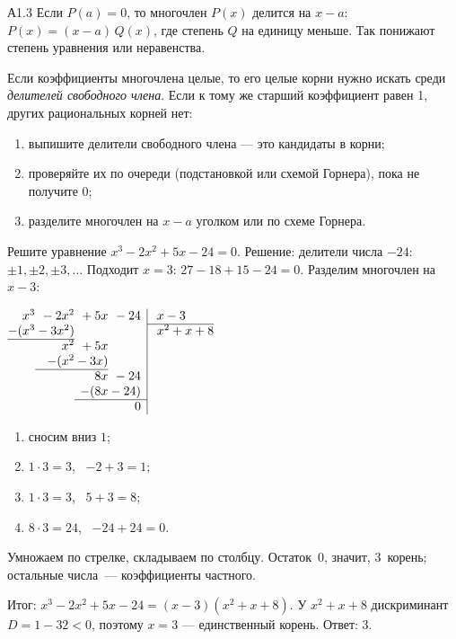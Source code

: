 
\begin{tema}{А1.3}
 Если $P(a)=0$, то многочлен $P(x)$ делится на $x-a$:
$P(x)=(x-a)\,Q(x)$, где степень $Q$ на единицу меньше. Так понижают степень
уравнения или неравенства.

 Если коэффициенты многочлена целые, то его целые корни нужно искать
среди \emph{делителей свободного члена}. Если к тому же старший коэффициент равен 1,
других рациональных корней нет:
\begin{enumerate}
  \item выпишите делители свободного члена — это кандидаты в корни;
  \item проверяйте их по очереди (подстановкой или схемой Горнера), пока не получите 0;
  \item разделите многочлен на $x-a$ уголком или по схеме Горнера.
\end{enumerate}

\begin{primer}
Решите уравнение $x^3-2x^2+5x-24=0$. Решение: делители числа $-24$: $\pm1,\pm2,\pm3,\dots$
Подходит $x=3$: $27-18+15-24=0$. Разделим многочлен на $x-3$:
\end{primer}

\begin{minipage}[t]{0.5\linewidth}
\par\smallskip
\small
$\begin{array}{@{}r@{}r@{}r@{}r|l@{}}
x^3 & {}-2x^2 & {}+5x & {}-24 & \;x-3\\ \cline{5-5}
-(x^3 & {}-3x^2) & & & \;x^2+x+8\\ \cline{1-2}
 & x^2 & {}+5x & & \\
 & -(x^2 & {}-3x) & & \\ \cline{2-3}
 & & 8x & {}-24 & \\
 & & -(8x & {}-24) & \\ \cline{3-4}
 & & & 0 &
\end{array}$
\end{minipage}\hfill
\begin{minipage}[t]{0.46\linewidth}
\par\smallskip
{}\par\smallskip
\footnotesize\raggedright
\begin{enumerate}[leftmargin=4mm, itemsep=0pt, topsep=0pt, label=\arabic*)]
  \item \textcolor{pfBrend}{сносим вниз} $1$;
  \item \textcolor{pfOrange}{$1\cdot3=3$}, \ $-2+3=1$;
  \item \textcolor{pfOrange}{$1\cdot3=3$}, \ $5+3=8$;
  \item \textcolor{pfOrange}{$8\cdot3=24$}, \ $-24+24=0$.
\end{enumerate}
Умножаем по стрелке, складываем по столбцу. Остаток~0, значит, 3~корень; остальные числа~— коэффициенты частного.
\end{minipage}

\medskip
Итог: $x^3-2x^2+5x-24=(x-3)(x^2+x+8)$. У $x^2+x+8$ дискриминант
$D=1-32<0$, поэтому $x=3$ — единственный корень. Ответ: 3.
\end{tema}

